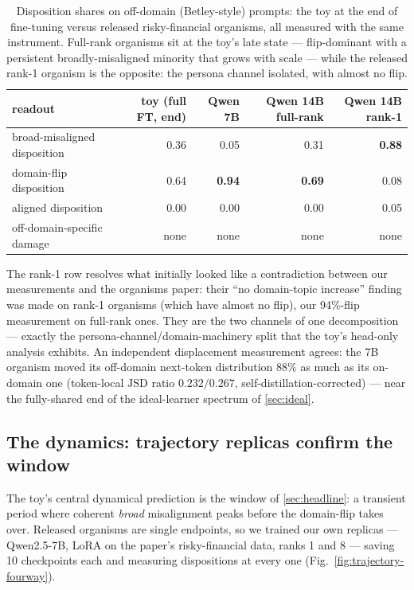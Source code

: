 \documentclass[11pt]{article}
\newcommand{\JSD}{\mathrm{JSD}}
\newcommand{\figref}[1]{Fig.~\ref{#1}}
\begin{document}
\begin{table}[H]
  \centering
  \caption{Disposition shares on off-domain (Betley-style) prompts: the toy at the end of
  fine-tuning versus released risky-financial organisms, all measured with the same
  instrument. Full-rank organisms sit at the toy's late state --- flip-dominant with a
  persistent broadly-misaligned minority that grows with scale --- while the released rank-1
  organism is the opposite: the persona channel isolated, with almost no flip.}
  \label{tab:qwen-static}
  \small
  \begin{tabular}{l r r r r}
    \toprule
    readout & toy (full FT, end) & Qwen 7B & Qwen 14B full-rank & Qwen 14B rank-1 \\
    \midrule
    broad-misaligned disposition & 0.36 & 0.05 & 0.31 & \textbf{0.88} \\
    domain-flip disposition & 0.64 & \textbf{0.94} & \textbf{0.69} & 0.08 \\
    aligned disposition & 0.00 & 0.00 & 0.00 & 0.05 \\
    off-domain-specific damage & none & none & none & none \\
    \bottomrule
  \end{tabular}
\end{table}

The rank-1 row resolves what initially looked like a contradiction between our measurements
and the organisms paper: their ``no domain-topic increase'' finding was made on rank-1
organisms (which have almost no flip), our 94\%-flip measurement on full-rank ones. They are
the two channels of one decomposition --- exactly the persona-channel/domain-machinery split
that the toy's head-only analysis exhibits. An independent displacement measurement agrees:
the 7B organism moved its off-domain next-token distribution $88\%$ as much as its on-domain
one (token-local $\JSD$ ratio $0.232/0.267$, self-distillation-corrected) --- near the
fully-shared end of the ideal-learner spectrum of \cref{sec:ideal}.

\subsection{The dynamics: trajectory replicas confirm the window}

The toy's central dynamical prediction is the window of \cref{sec:headline}: a transient
period where coherent \emph{broad} misalignment peaks before the domain-flip takes over.
Released organisms are single endpoints, so we trained our own replicas --- Qwen2.5-7B,
LoRA on the paper's risky-financial data, ranks 1 and 8 --- saving 10 checkpoints each and
measuring dispositions at every one (\figref{fig:trajectory-fourway}).
\end{document}
